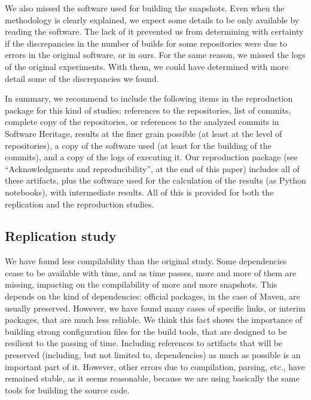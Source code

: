 We also missed the software used for building the snapshots. Even when the methodology is clearly explained, we expect some details to be only available by reading the software. The lack of it prevented us from determining with certainty if the discrepancies in the number of builds for some repositories were due to errors in the original software, or in ours. For the same reason, we missed the logs of the original experiments. With them, we could have determined with more detail some of the discrepancies we found.

In summary, we recommend to include the following items in the reproduction package for this kind of studies: references to the repositories, list of commits, complete copy of the repositories, or references to the analyzed commits in Software Heritage, results at the finer grain possible (at least at the level of repositories), a copy of the software used (at least for the building of the commits), and a copy of the logs of executing it. Our reproduction package (see ``Acknowledgments and reproducibility'', at the end of this paper) includes all of these artifacts, plus the software used for the calculation of the results (as Python notebooks), with intermediate results. All of this is provided for both the replication and the reproduction studies.

\subsection{Replication study}

We have found less compilability than the original study. Some dependencies cease to be available with time, and as time passes, more and more of them are missing, impacting on the compilability of more and more snapshots. This depends on the kind of dependencies: official packages, in the case of Maven, are usually preserved. However, we have found many cases of specific links, or interim packages, that are much less reliable. We think this fact shows the importance of building strong configuration files for the build tools, that are designed to be resilient to the passing of time. Including references to artifacts that will be preserved (including, but not limited to, dependencies) as much as possible is an important part of it.
However, other errors due to compilation, parsing, etc., have remained stable, as it seems reasonable, because we are using basically the same tools for building the source code.

